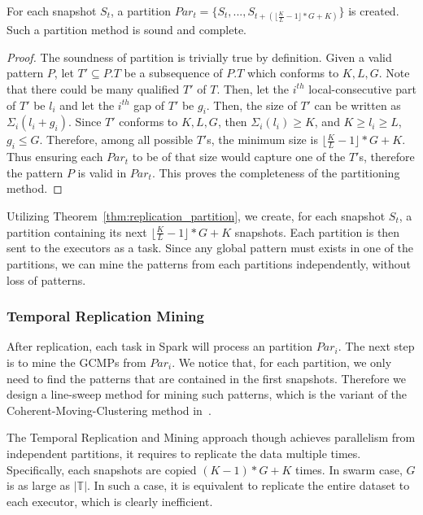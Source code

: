 \begin{theorem}
\label{thm:replication_partition}
For each snapshot $S_t$, a partition $Par_t = \{S_t, ...,S_{t+(\lfloor \frac{K}{L}-1\rfloor *G+K)}\}$ 
is created. Such a partition method is sound and complete.
\end{theorem}
\begin{proof}
The soundness of partition is trivially true by definition.
Given a valid pattern $P$, let $T' \subseteq P.T$ be a subsequence of $P.T$ which conforms to $K,L,G$. Note that there could be many qualified $T'$ of $T$. Then, 
let the $i^{th}$ local-consecutive part of $T'$ be $l_i$ and let the $i^{th}$ gap of $T'$ be $g_i$. Then, the size of $T'$ can be written as $\Sigma_i (l_i + g_i)$. Since $T'$ conforms to $K,L,G$, then $\Sigma_i (l_i) \geq K$, and $K \geq l_i \geq L$, $g_i \leq G$. Therefore, among all possible $T'$s, the minimum size is $\lfloor \frac{K}{L}-1\rfloor *G+K$. Thus ensuring each $Par_t$ to be of that size would capture one of the $T'$s, therefore the pattern $P$ is valid in $Par_t$. This proves the completeness of the partitioning method.
\end{proof}

Utilizing Theorem~\ref{thm:replication_partition}, we create, for each snapshot $S_t$, 
a partition containing its next $\lfloor \frac{K}{L}-1\rfloor *G+K$ snapshots. Each partition is then
sent to the executors as a task. Since any global pattern must exists in one of the partitions, we can mine the patterns from each partitions independently, without loss of patterns.

\subsubsection{Temporal Replication Mining}
After replication, each task in Spark will process an partition $Par_i$. The next
step is to mine the GCMPs from $Par_i$. We notice that, for each 
partition, we only need to find the patterns that
are contained in the first snapshots. Therefore we design a line-sweep method for mining 
such patterns, which is the variant of the Coherent-Moving-Clustering method in~\cite{jeung2008convoy}.

The Temporal Replication and Mining approach though achieves parallelism from independent
partitions, it requires to replicate the data multiple times. 
Specifically, each snapshots are copied $(K-1)*G+K$ times. In swarm
case, $G$ is as large as $|\mathbb{T}|$. In such a case, it is equivalent to replicate the entire dataset 
to each executor, which is clearly inefficient.


